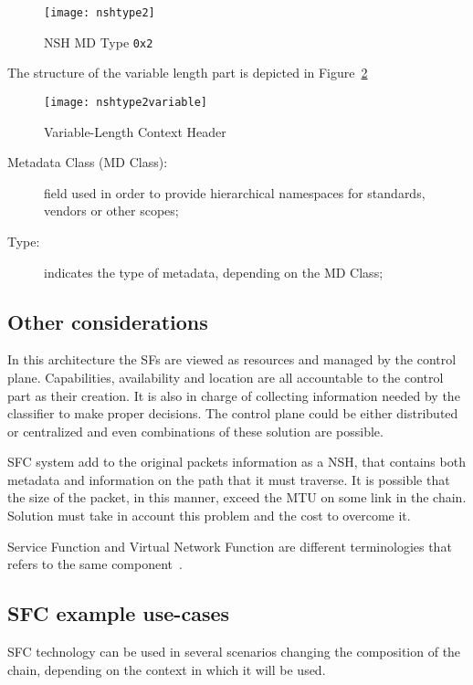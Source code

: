 \begin{figure}[H]
  \centering
  \texttt{[image: nshtype2]}
  \caption[NSH MD Type \texttt{0x2}]{NSH MD Type \texttt{0x2}~\cite{rfc8300}}
  \label{chap:background:img:nshtype2}
\end{figure}

The structure of the variable length part is depicted in
Figure~\ref{chap:background:img:nshtype2variable}

\begin{figure}[H]
  \centering
  \texttt{[image: nshtype2variable]}
  \caption[Variable-Length Context Header]{Variable-Length Context
    Header~\cite{rfc8300}}
  \label{chap:background:img:nshtype2variable}
\end{figure}

\begin{description}
  \item[Metadata Class (MD Class):] field used in order to provide hierarchical
  namespaces for standards, vendors or other scopes;
  \item[Type:] indicates the type of metadata, depending on the MD Class;
\end{description}

\subsection{Other considerations}
In this architecture the SFs are viewed as resources and managed by the control
plane. Capabilities, availability and location are all accountable to the
control part as their creation. It is also in charge of collecting information
needed by the classifier to make proper decisions. The control plane could be
either distributed or centralized and even combinations of these solution are
possible.

SFC system add to the original packets information as a NSH, that contains both
metadata and information on the path that it must traverse. It is possible that
the size of the packet, in this manner, exceed the MTU on some link in the
chain. Solution must take in account this problem and the cost to overcome it.

Service Function and Virtual Network Function are different terminologies that
refers to the same component~\cite{medhat2017service}.

\subsection{SFC example use-cases}
SFC technology can be used in several scenarios changing the composition of the
chain, depending on the context in which it will be used.

